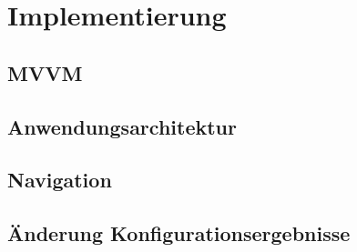 \chapter{Implementierung}\label{chapter_5}

\section{MVVM}
\section{Anwendungsarchitektur}
\section{Navigation}
\section{Änderung Konfigurationsergebnisse}
